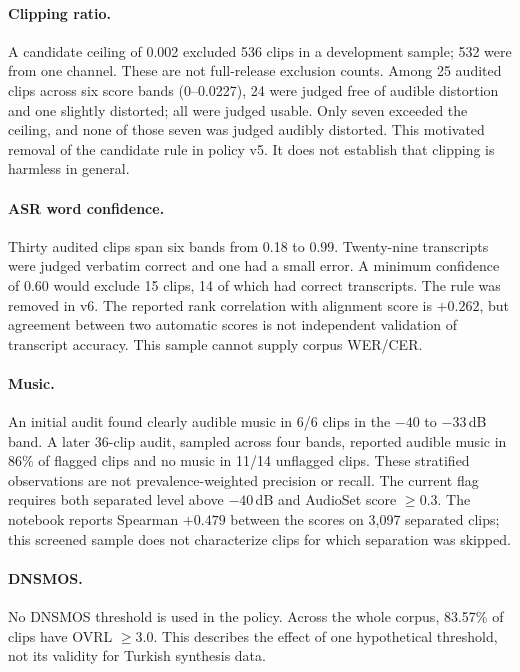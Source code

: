 \documentclass[11pt,a4paper]{article}
\begin{document}
\paragraph{Clipping ratio.}
A candidate ceiling of 0.002 excluded 536 clips in a development sample;
532 were from one channel. These are not full-release exclusion counts.
Among 25 audited clips across six score bands (0--0.0227), 24 were judged
free of audible distortion and one slightly distorted; all were judged usable.
Only seven exceeded the ceiling, and none of those seven was judged audibly
distorted. This motivated removal of the candidate rule in policy v5.
It does not establish that clipping is harmless in general.

\paragraph{ASR word confidence.}
Thirty audited clips span six bands from 0.18 to 0.99. Twenty-nine transcripts
were judged verbatim correct and one had a small error. A minimum confidence
of 0.60 would exclude 15 clips, 14 of which had correct transcripts. The rule
was removed in v6. The reported rank correlation with alignment score is
$+0.262$, but agreement between two automatic scores is not independent
validation of transcript accuracy. This sample cannot supply corpus WER/CER.

\paragraph{Music.}
An initial audit found clearly audible music in 6/6 clips in the
$-40$ to $-33$\,dB band. A later 36-clip audit, sampled across four bands,
reported audible music in 86\% of flagged clips and no music in 11/14
unflagged clips. These stratified observations are not prevalence-weighted
precision or recall. The current flag requires both separated level above
$-40$\,dB and AudioSet score $\ge 0.3$. The notebook reports Spearman
$+0.479$ between the scores on 3,097 separated clips; this screened sample
does not characterize clips for which separation was skipped.

\paragraph{DNSMOS.}
No DNSMOS threshold is used in the policy. Across the whole corpus,
83.57\% of clips have OVRL $\ge 3.0$. This describes the effect of one
hypothetical threshold, not its validity for Turkish synthesis data.
\end{document}
